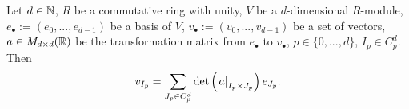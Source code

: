 \begin{proposition}
  Let
    $d \in \mathbb{N}$,
    $R$ be a commutative ring with unity,
    $V$ be a $d$-dimensional $R$-module,
    $e_\bullet := (e_0, ..., e_{d - 1})$ be a basis of $V$,
    $v_\bullet := (v_0, ..., v_{d - 1})$ be a set of vectors,
    $a \in M_{d \times d}(\mathbb{R})$ be the transformation matrix from
      $e_\bullet$ to $v_\bullet$,
    $p \in \{0, ..., d\}$,
    $I_p \in C^d_p$.
  Then
  \begin{equation}
    v_{I_p} =
    \sum_{J_p \in C^d_p} \det \left(\left. a \right|_{I_p \times J_p}\right) e_{J_p}.
  \end{equation}
\end{proposition}
